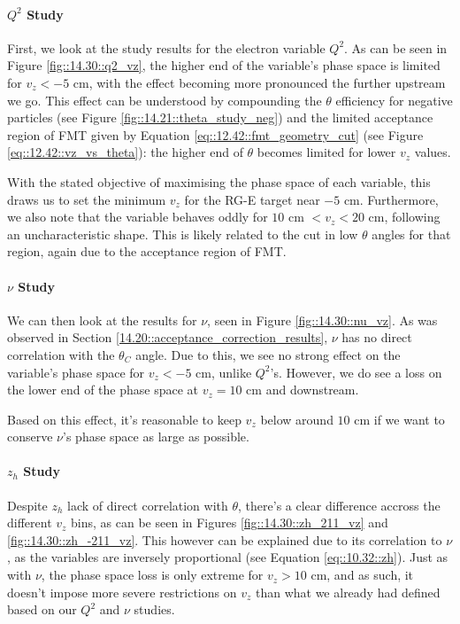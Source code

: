     \paragraph{$Q^2$ Study}
        First, we look at the study results for the electron variable $Q^2$.
        As can be seen in Figure \ref{fig::14.30::q2_vz}, the higher end of the variable's phase space is limited for $v_z < -5$ cm, with the effect becoming more pronounced the further upstream we go.
        This effect can be understood by compounding the $\theta$ efficiency for negative particles (see Figure \ref{fig::14.21::theta_study_neg}) and the limited acceptance region of FMT given by Equation \eqref{eq::12.42::fmt_geometry_cut} (see Figure \ref{eq::12.42::vz_vs_theta}): the higher end of $\theta$ becomes limited for lower $v_z$ values.

        With the stated objective of maximising the phase space of each variable, this draws us to set the minimum $v_z$ for the RG-E target near $-5$ cm.
        Furthermore, we also note that the variable behaves oddly for $10$ cm $< v_z < 20$ cm, following an uncharacteristic shape.
        This is likely related to the cut in low $\theta$ angles for that region, again due to the acceptance region of FMT.

    \paragraph{$\nu$ Study}
        We can then look at the results for $\nu$, seen in Figure \ref{fig::14.30::nu_vz}.
        As was observed in Section \ref{14.20::acceptance_correction_results}, $\nu$ has no direct correlation with the $\theta_C$ angle.
        Due to this, we see no strong effect on the variable's phase space for $v_z < -5$ cm, unlike $Q^2$'s.
        However, we do see a loss on the lower end of the phase space at $v_z = 10$ cm and downstream.

        Based on this effect, it's reasonable to keep $v_z$ below around $10$ cm if we want to conserve $\nu$'s phase space as large as possible.

    \paragraph{$z_h$ Study}
        Despite $z_h$ lack of direct correlation with $\theta$, there's a clear difference accross the different $v_z$ bins, as can be seen in Figures \ref{fig::14.30::zh_211_vz} and \ref{fig::14.30::zh_-211_vz}.
        This however can be explained due to its correlation to $\nu$, as the variables are inversely proportional (see Equation \eqref{eq::10.32::zh}).
        Just as with $\nu$, the phase space loss is only extreme for $v_z > 10$ cm, and as such, it doesn't impose more severe restrictions on $v_z$ than what we already had defined based on our $Q^2$ and $\nu$ studies.

